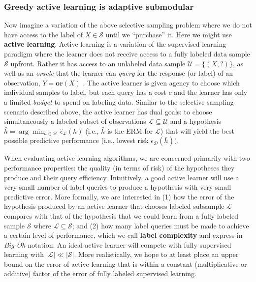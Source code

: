 \subsubsection{Greedy active learning is adaptive submodular}

Now imagine a variation of the above selective sampling problem where we do not have access to the label of $X \in \mathcal{S}$ until we ``purchase'' it. Here we might use \textbf{active learning}. Active learning is a variation of the supervised learning paradigm where the learner does not receive access to a fully labeled data sample $\mathcal{S}$ upfront. Rather it has access to an unlabeled data sample $\mathcal{U} = \{(X, ?)\}$, as well as an \textit{oracle} that the learner can \textit{query} for the response (or label) of an observation, $Y = \mathbf{or}(X)$ \cite{dasgupta2011}. The active learner is given agency to choose which individual samples to label, but each query has a cost $c$ and the learner has only a limited \textit{budget} to spend on labeling data. Similar to the selective sampling scenario described above, the active learner has dual goals: to choose simultaneously a labeled subset of observations $\mathcal{L} \subseteq \mathcal{U}$ and a hypothesis $\bar{h} = \arg\min_{h \in \mathcal{H}} \hat{\epsilon}_{\mathcal{L}}(h)$ (i.e., $\bar{h}$ is the ERM for $\mathcal{L}$) that will yield the best possible predictive performance (i.e., lowest risk $\epsilon_{\mathcal{D}}(\bar{h}))$.

When evaluating active learning algorithms, we are concerned primarily with two performance properties: the quality (in terms of risk) of the hypotheses they produce and their query efficiency. Intuitively, a good active learner will use a very small number of label queries to produce a hypothesis with very small predictive error. More formally, we are interested in (1) how the error of the hypothesis produced by an active learner that chooses labeled subsample $\mathcal{L}$ compares with that of the hypothesis that we could learn from a fully labeled sample $\mathcal{S}$ where $\mathcal{L} \subseteq \mathcal{S}$; and (2) how many label queries must be made to achieve a certain level of performance, which we call \textbf{label complexity} and express in \textit{Big-Oh} notation. An ideal active learner will compete with fully supervised learning with $|\mathcal{L}| \ll |\mathcal{S}|$. More realistically, we hope to at least place an upper bound on the error of active learning that is within a constant (multiplicative or additive) factor of the error of fully labeled supervised learning.


